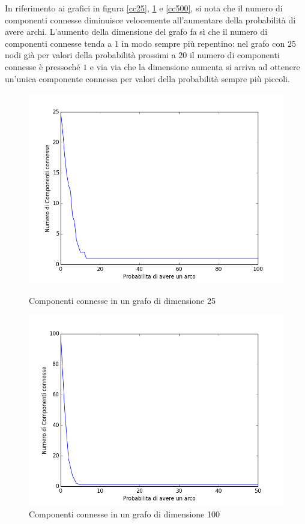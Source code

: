 \documentclass[11pt]{article}
\begin{document}
In riferimento ai grafici in figura \ref{cc25}, \ref{cc100} e \ref{cc500}, si nota che il numero di componenti connesse diminuisce velocemente all'aumentare della probabilità di avere archi. L'aumento della dimensione del grafo fa sì che il numero di componenti connesse tenda a $1$ in modo sempre più repentino: nel grafo con $25$ nodi già per valori della probabilità prossimi a $20$ il numero di componenti connesse è pressoché $1$ e via via che la dimensione aumenta si arriva ad ottenere un'unica componente connessa per valori della probabilità sempre più piccoli.
\begin{figure}[h]
\centering
\includegraphics[scale=0.33,angle=0]{cc25.png}
\caption{Componenti connesse in un grafo di dimensione 25}
\label{cc25}
\includegraphics[scale=0.33,angle=0]{cc100.png}
\caption{Componenti connesse in un grafo di dimensione 100}
\label{cc100}
\end{figure}
\end{document}
